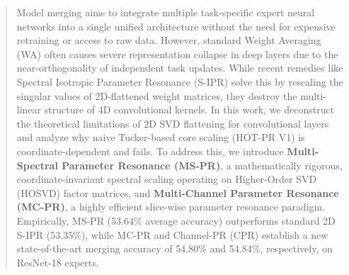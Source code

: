 \documentclass{article}
\theoremstyle{plain}
\theoremstyle{definition}
\theoremstyle{remark}
\begin{document}

\printAffiliationsAndNotice{}

\begin{abstract}
  Model merging aims to integrate multiple task-specific expert neural networks into a single unified architecture without the need for expensive retraining or access to raw data. However, standard Weight Averaging (WA) often causes severe representation collapse in deep layers due to the near-orthogonality of independent task updates. While recent remedies like Spectral Isotropic Parameter Resonance (S-IPR) solve this by rescaling the singular values of 2D-flattened weight matrices, they destroy the multi-linear structure of 4D convolutional kernels. In this work, we deconstruct the theoretical limitations of 2D SVD flattening for convolutional layers and analyze why naive Tucker-based core scaling (HOT-PR V1) is coordinate-dependent and fails. To address this, we introduce \textbf{Multi-Spectral Parameter Resonance (MS-PR)}, a mathematically rigorous, coordinate-invariant spectral scaling operating on Higher-Order SVD (HOSVD) factor matrices, and \textbf{Multi-Channel Parameter Resonance (MC-PR)}, a highly efficient slice-wise parameter resonance paradigm. Empirically, MS-PR (53.64\% average accuracy) outperforms standard 2D S-IPR (53.35\%), while MC-PR and Channel-PR (CPR) establish a new state-of-the-art merging accuracy of 54.80\% and 54.84\%, respectively, on ResNet-18 experts.
\end{abstract}
\end{document}
